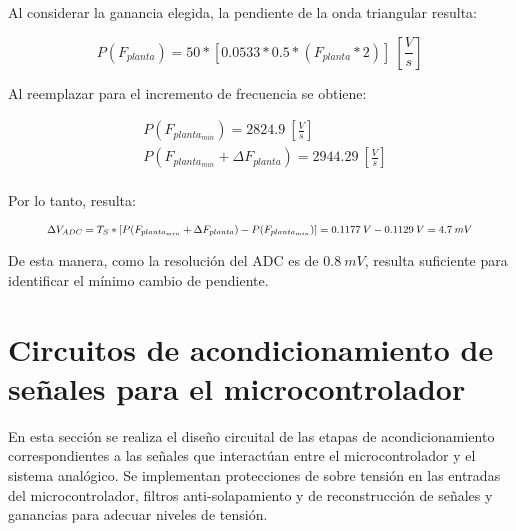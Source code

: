 


Al considerar la ganancia elegida,  la pendiente de la onda triangular resulta:

\begin{equation} 
	P(F_{planta}) = 50 * [0.0533 * 0.5 * (F_{planta}*2)]\:[\frac{V}{s}]
\end{equation}

 Al reemplazar para el incremento de frecuencia se obtiene: 

\begin{equation*} 
	\begin{aligned}
		&P(F_{planta_{min}}) = 2824.9 \: [\frac{V}{s}]\\
		&P(F_{planta_{min}} + \Delta F_{planta}) = 2944.29 \: [\frac{V}{s}]\\		 
	\end{aligned}
\end{equation*}

 Por lo tanto, resulta:


\begin{equation*} 
	\resizebox{.9\hsize}{!}
	{
	$\Delta V_{ADC} = T_S * [P(F_{planta_{min}} + \Delta F_{planta}) - P(F_{planta_{min}})] = 0.1177\:V - 0.1129\:V = 4.7\:mV$
	}
\end{equation*}


 De esta manera, como la resolución del ADC es de $0.8\:mV$, resulta suficiente para identificar el mínimo cambio de pendiente.


\section{Circuitos de acondicionamiento de señales para el microcontrolador}
En esta sección se realiza el diseño circuital de las etapas de acondicionamiento correspondientes a las señales que interactúan entre el microcontrolador y el sistema analógico. Se implementan protecciones de sobre tensión en las entradas del microcontrolador, filtros anti-solapamiento y de reconstrucción de señales y ganancias para adecuar niveles de tensión.

